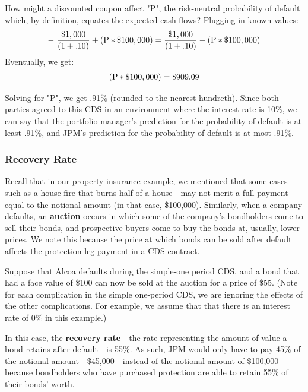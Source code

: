 \documentclass[article]{jss}
\begin{document}
How might a discounted coupon affect "P", the risk-neutral probability of default which, by definition, equates the expected cash flows? Plugging in known values:
\begin{equation}
 \begin{aligned}
  {\rm -\hspace{3pt}\frac{\$1,000}{(1 + .10)} + (P * \$100,000) = \frac{\$1,000}{(1 + .10)} - (P * \$100,000)} 
    \end{aligned}
\end{equation}
Eventually, we get:
\begin{equation}
 \begin{aligned}
  {\rm (P * \$100,000) = \$909.09}  
    \end{aligned}
\end{equation}

Solving for "P", we get .91\% (rounded to the nearest hundreth). Since both parties agreed to this CDS in an environment where the interest rate is 10\%, we can say that the portfolio manager's prediction for the probability of default is at least .91\%, and JPM's prediction for the probability of default is at most .91\%. 

\subsubsection{Recovery Rate}
\label{sec:recovery}

Recall that in our property insurance example, we mentioned that some cases---such as a house fire that burns half of a house---may not merit a full payment equal to the notional amount (in that case, \$100,000). Similarly, when a company defaults, an \textbf{auction} occurs in which some of the company's bondholders come to sell their bonds, and prospective buyers come to buy the bonds at, usually, lower prices. We note this because the price at which bonds can be sold after default affects the protection leg payment in a CDS contract.

Suppose that Alcoa defaults during the simple-one period CDS, and a bond that had a face value of \$100 can now be sold at the auction for a price of \$55. (Note for each complication in the simple one-period CDS, we are ignoring the effects of the other complications. For example, we assume that that there is an interest rate of 0\% in this example.)

In this case, the \textbf{recovery rate}---the rate representing the amount of value a bond retains after default---is 55\%. As such, JPM would only have to pay 45\% of the notional amount---\$45,000---instead of the notional amount of \$100,000 because bondholders who have purchased protection are able to retain 55\% of their bonds' worth. 
\end{document}
